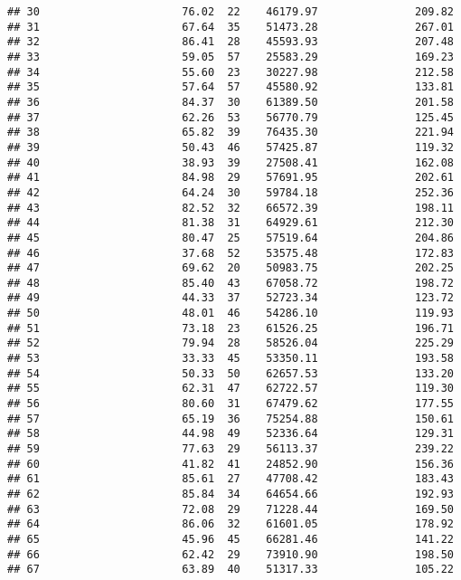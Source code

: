 \documentclass[
]{article}
\begin{document}
\begin{verbatim}
## 30                      76.02  22    46179.97               209.82
## 31                      67.64  35    51473.28               267.01
## 32                      86.41  28    45593.93               207.48
## 33                      59.05  57    25583.29               169.23
## 34                      55.60  23    30227.98               212.58
## 35                      57.64  57    45580.92               133.81
## 36                      84.37  30    61389.50               201.58
## 37                      62.26  53    56770.79               125.45
## 38                      65.82  39    76435.30               221.94
## 39                      50.43  46    57425.87               119.32
## 40                      38.93  39    27508.41               162.08
## 41                      84.98  29    57691.95               202.61
## 42                      64.24  30    59784.18               252.36
## 43                      82.52  32    66572.39               198.11
## 44                      81.38  31    64929.61               212.30
## 45                      80.47  25    57519.64               204.86
## 46                      37.68  52    53575.48               172.83
## 47                      69.62  20    50983.75               202.25
## 48                      85.40  43    67058.72               198.72
## 49                      44.33  37    52723.34               123.72
## 50                      48.01  46    54286.10               119.93
## 51                      73.18  23    61526.25               196.71
## 52                      79.94  28    58526.04               225.29
## 53                      33.33  45    53350.11               193.58
## 54                      50.33  50    62657.53               133.20
## 55                      62.31  47    62722.57               119.30
## 56                      80.60  31    67479.62               177.55
## 57                      65.19  36    75254.88               150.61
## 58                      44.98  49    52336.64               129.31
## 59                      77.63  29    56113.37               239.22
## 60                      41.82  41    24852.90               156.36
## 61                      85.61  27    47708.42               183.43
## 62                      85.84  34    64654.66               192.93
## 63                      72.08  29    71228.44               169.50
## 64                      86.06  32    61601.05               178.92
## 65                      45.96  45    66281.46               141.22
## 66                      62.42  29    73910.90               198.50
## 67                      63.89  40    51317.33               105.22

\end{verbatim}
\end{document}
